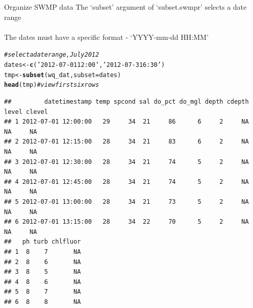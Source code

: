 \documentclass[xcolor=svgnames]{beamer}\usepackage[]{graphicx}\usepackage[]{color}
\makeatletter
\newcommand{\hlstr}[1]{\textcolor[rgb]{0.192,0.494,0.8}{#1}}%
\newcommand{\hlcom}[1]{\textcolor[rgb]{0.678,0.584,0.686}{\textit{#1}}}%
\newcommand{\hlstd}[1]{\textcolor[rgb]{0.345,0.345,0.345}{#1}}%
\newcommand{\hlkwb}[1]{\textcolor[rgb]{0.69,0.353,0.396}{#1}}%
\newcommand{\hlkwc}[1]{\textcolor[rgb]{0.333,0.667,0.333}{#1}}%
\newcommand{\hlkwd}[1]{\textcolor[rgb]{0.737,0.353,0.396}{\textbf{#1}}}%
\newenvironment{kframe}{%
 \def\at@end@of@kframe{}%
 \ifinner\ifhmode%
  \def\at@end@of@kframe{\end{minipage}}%
  \begin{minipage}{\columnwidth}%
 \fi\fi%
 \def\FrameCommand##1{\hskip\@totalleftmargin \hskip-\fboxsep
 \colorbox{shadecolor}{##1}\hskip-\fboxsep
     \hskip-\linewidth \hskip-\@totalleftmargin \hskip\columnwidth}%
 \MakeFramed {\advance\hsize-\width
   \@totalleftmargin\z@ \linewidth\hsize
   \@setminipage}}%
 {\par\unskip\endMakeFramed%
 \at@end@of@kframe}
\newenvironment{knitrout}{}{} %
\makeatother
\begin{document}
\begin{frame}[containsverbatim]{Organize SWMP data}
The `subset' argument of `subset.swmpr' selects a date range \\~\\
The dates must have a specific format - `YYYY-mm-dd HH:MM'
\begin{knitrout}\scriptsize
{}\color{fgcolor}\begin{kframe}
\begin{alltt}
\hlcom{# select a date range, July 2012}
\hlstd{dates} \hlkwb{<-} \hlkwd{c}\hlstd{(}\hlstr{'2012-07-01 12:00'}\hlstd{,} \hlstr{'2012-07-31 6:30'}\hlstd{)}
\hlstd{tmp} \hlkwb{<-} \hlkwd{subset}\hlstd{(wq_dat,} \hlkwc{subset} \hlstd{= dates)}
\hlkwd{head}\hlstd{(tmp)} \hlcom{# view first six rows}
\end{alltt}
\begin{verbatim}
##         datetimestamp temp spcond sal do_pct do_mgl depth cdepth level clevel
## 1 2012-07-01 12:00:00   29     34  21     86      6     2     NA    NA     NA
## 2 2012-07-01 12:15:00   28     34  21     83      6     2     NA    NA     NA
## 3 2012-07-01 12:30:00   28     34  21     74      5     2     NA    NA     NA
## 4 2012-07-01 12:45:00   28     34  21     74      5     2     NA    NA     NA
## 5 2012-07-01 13:00:00   28     34  21     73      5     2     NA    NA     NA
## 6 2012-07-01 13:15:00   28     34  22     70      5     2     NA    NA     NA
##   ph turb chlfluor
## 1  8    7       NA
## 2  8    6       NA
## 3  8    5       NA
## 4  8    6       NA
## 5  8    7       NA
## 6  8    8       NA
\end{verbatim}
\end{kframe}
\end{knitrout}
\end{frame}
\end{document}
